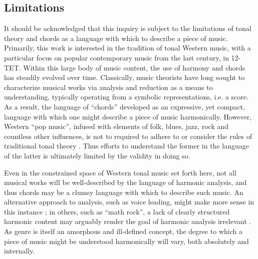\subsection{Limitations}
\label{subsec:limitations}

It should be acknowledged that this inquiry is subject to the limitations of tonal theory and chords as a language with which to describe a piece of music.
Primarily, this work is interested in the tradition of tonal Western music, with a particular focus on popular contemporary music from the last century, in 12-TET.
Within this large body of music content, the use of harmony and chords has steadily evolved over time.
Classically, music theorists have long sought to characterize musical works via analysis and reduction as a means to understanding, typically operating from a symbolic representations, i.e. a score.
As a result, the language of ``chords'' developed as an expressive, yet compact, language with which one might describe a piece of music harmonically.
However, Western ``pop music'', infused with elements of folk, blues, jazz, rock and countless other influences, is not to required to adhere to or consider the rules of traditional tonal theory \cite{PopMusicTheory}.
Thus efforts to understand the former in the language of the latter is ultimately limited by the validity in doing so.

Even in the constrained space of Western tonal music set forth here, not all musical works will be well-described by the language of harmonic analysis, and thus chords may be a clumsy language with which to describe such music.
An alternative approach to analysis, such as voice leading, might make more sense in this instance \cite{VoiceLeading};
in others, such as ``math rock'', a lack of clearly structured harmonic content may arguably render the goal of harmonic analysis irrelevant \cite{MathRock}.
As genre is itself an amorphous and ill-defined concept, the degree to which a piece of music might be understood harmonically will vary, both absolutely and internally.


